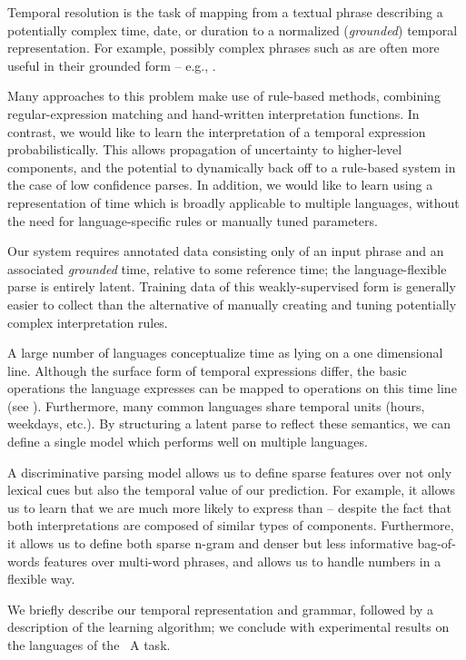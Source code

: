 Temporal resolution is the task of mapping from a textual phrase describing
	a potentially complex time, date, or duration to a normalized
	(\textit{grounded}) temporal representation.
For example, possibly complex phrases such as  are
	often more useful in their grounded form -- e.g., .

Many approaches to this problem make use of rule-based methods, combining
  regular-expression matching and hand-written interpretation functions.
In contrast, we would like to learn the interpretation of a
  temporal expression probabilistically.
This allows propagation of uncertainty
	to higher-level components, and the potential to dynamically back off to
  a rule-based system in the case of low confidence parses.
In addition, we would like to learn using a representation of time which is
  broadly applicable to multiple languages, without the need for
  language-specific rules or manually tuned parameters.

Our system requires annotated data consisting only of an input phrase and
  an associated \textit{grounded} time, relative to some reference time;
  the language-flexible parse is entirely latent.
Training data of this weakly-supervised form
  is generally easier to collect than the alternative of
  manually creating and tuning potentially complex interpretation rules.

A large number of languages conceptualize time as lying on a one dimensional
  line.
Although the surface form of temporal expressions differ, the basic operations
  the language expresses can be mapped to  operations on this
  time line (see ).
Furthermore, many common languages share temporal units (hours, weekdays, etc.).
By structuring a latent parse to reflect these semantics, we can define a single
  model which performs well on multiple languages.

A discriminative parsing model allows us to define sparse features
  over not only lexical cues but also the temporal value of our prediction.
For example, it allows us to learn that we are much more likely to
  express  than  -- despite the fact that
  both interpretations are composed of similar types of components.
Furthermore, it allows us to define both sparse n-gram and denser but less
  informative bag-of-words features over multi-word phrases, and allows us
  to handle numbers in a flexible way.

We briefly describe our temporal representation and grammar,
	followed by a description of the learning algorithm; 
	we conclude with experimental results on the languages of the
  \tempeval\ A task.



